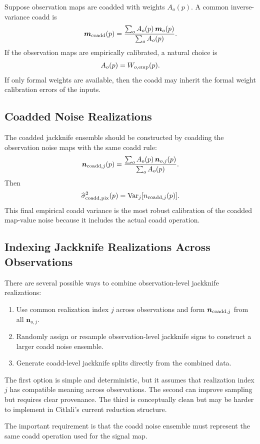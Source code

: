 \documentclass[11pt]{article}
\newcommand{\map}{\boldsymbol{m}}
\newcommand{\noise}{\boldsymbol{n}}
\newcommand{\var}{\operatorname{Var}}
\begin{document}
Suppose observation maps are coadded with weights \(A_o(p)\). A common
inverse-variance coadd is
\[
  \map_{\rm coadd}(p)
    =
    \frac{
      \sum_o A_o(p)\,\map_o(p)
    }{
      \sum_o A_o(p)
    }.
\]
If the observation maps are empirically calibrated, a natural choice is
\[
  A_o(p) = W_{o,{\rm emp}}(p).
\]
If only formal weights are available, then the coadd may inherit the formal
weight calibration errors of the inputs.

\subsection{Coadded Noise Realizations}

The coadded jackknife ensemble should be constructed by coadding the observation
noise maps with the same coadd rule:
\[
  \noise_{{\rm coadd},j}(p)
    =
    \frac{
      \sum_o A_o(p)\,\noise_{o,j}(p)
    }{
      \sum_o A_o(p)
    }.
\]
Then
\[
  \widehat{\sigma}^2_{{\rm coadd},{\rm pix}}(p)
    =
    \var_j[n_{{\rm coadd},j}(p)].
\]
This final empirical coadd variance is the most robust calibration of the
coadded map-value noise because it includes the actual coadd operation.

\subsection{Indexing Jackknife Realizations Across Observations}

There are several possible ways to combine observation-level jackknife
realizations:

\begin{enumerate}[leftmargin=1.5em]
\item Use common realization index \(j\) across observations and form
\(\noise_{{\rm coadd},j}\) from all \(\noise_{o,j}\).
\item Randomly assign or resample observation-level jackknife signs to construct
a larger coadd noise ensemble.
\item Generate coadd-level jackknife splits directly from the combined data.
\end{enumerate}

The first option is simple and deterministic, but it assumes that realization
index \(j\) has compatible meaning across observations. The second can improve
sampling but requires clear provenance. The third is conceptually clean but may
be harder to implement in Citlali's current reduction structure.

The important requirement is that the coadd noise ensemble must represent the
same coadd operation used for the signal map.
\end{document}
